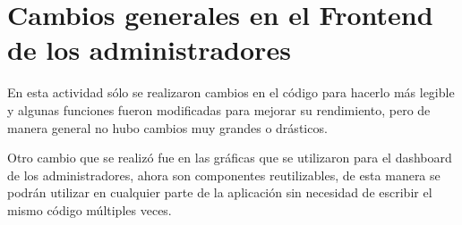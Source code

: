 \section{Cambios generales en el Frontend de los administradores}
En esta actividad sólo se realizaron cambios en el código para hacerlo más legible y algunas funciones fueron modificadas para mejorar su rendimiento, pero de manera general no hubo cambios muy grandes o drásticos. 

Otro cambio que se realizó fue en las gráficas que se utilizaron para el dashboard de los administradores, ahora son componentes reutilizables, de esta manera se podrán utilizar en cualquier parte de la aplicación sin necesidad de escribir el mismo código múltiples veces.
